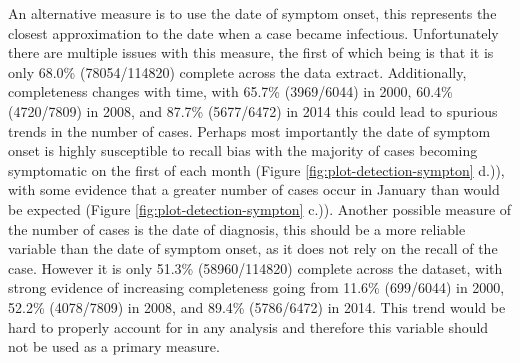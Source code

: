 \documentclass[11pt,twoside]{bristolthesis}
\begin{document}
  An alternative measure is to use the date of symptom onset, this represents the closest approximation to the date when a case became infectious. Unfortunately there are multiple issues with this measure, the first of which being is that it is only 68.0\% (78054/114820) complete across the data extract. Additionally, completeness changes with time, with 65.7\% (3969/6044) in 2000, 60.4\% (4720/7809) in 2008, and 87.7\% (5677/6472) in 2014 this could lead to spurious trends in the number of cases. Perhaps most importantly the date of symptom onset is highly susceptible to recall bias with the majority of cases becoming symptomatic on the first of each month (Figure \ref{fig:plot-detection-sympton} d.)), with some evidence that a greater number of cases occur in January than would be expected (Figure \ref{fig:plot-detection-sympton} c.)). Another possible measure of the number of cases is the date of diagnosis, this should be a more reliable variable than the date of symptom onset, as it does not rely on the recall of the case. However it is only 51.3\% (58960/114820) complete across the dataset, with strong evidence of increasing completeness going from 11.6\% (699/6044) in 2000, 52.2\% (4078/7809) in 2008, and 89.4\% (5786/6472) in 2014. This trend would be hard to properly account for in any analysis and therefore this variable should not be used as a primary measure.
\end{document}
